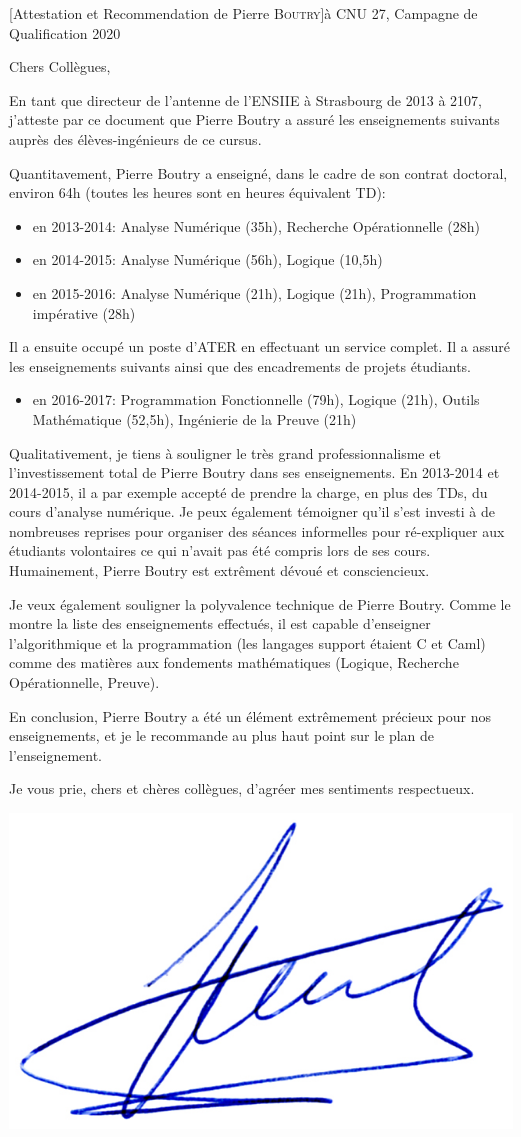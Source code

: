 \documentclass[a4paper,10pt]{article}
\begin{document}

\begin{letter}[Attestation et Recommendation de Pierre \textsc{Boutry}]{à}%
{CNU 27, Campagne de Qualification 2020}

Chers Collègues,

En tant que directeur de l'antenne de l'ENSIIE à Strasbourg de 2013 à 2107,
j'atteste par ce document que Pierre Boutry a assuré les enseignements suivants
auprès des élèves-ingénieurs de ce cursus.

\noindent 
Quantitavement, Pierre Boutry a enseigné, dans le cadre de son contrat doctoral, environ 64h (toutes les heures
sont en heures équivalent TD):
\begin{itemize}
	  \item  en 2013-2014: Analyse Numérique (35h), Recherche Opérationnelle (28h)
	  \item  en 2014-2015: Analyse Numérique (56h), Logique (10,5h)
	  \item  en 2015-2016:  Analyse Numérique (21h), Logique (21h), Programmation impérative (28h)
\end{itemize}

\smallskip

\noindent Il a ensuite occupé un poste d'ATER en effectuant un service complet. Il a assuré les
enseignements suivants ainsi que des encadrements de projets étudiants.
\begin{itemize}
	  \item  en 2016-2017:  Programmation Fonctionnelle (79h), Logique (21h), 
		    Outils Mathématique (52,5h), Ingénierie de la Preuve (21h)
\end{itemize}

\bigskip

\noindent Qualitativement, je tiens à souligner le très grand professionnalisme et l'investissement total
de Pierre Boutry dans ses enseignements. 
%
En 2013-2014 et 2014-2015, il a par exemple accepté de prendre la charge, en plus des TDs, du cours 
d'analyse numérique. Je peux également témoigner qu'il s'est investi à de nombreuses
reprises pour organiser des séances informelles pour ré-expliquer aux étudiants volontaires
ce qui n'avait pas été compris lors de ses cours. Humainement, Pierre Boutry est 
extrêment dévoué et consciencieux.

Je veux également souligner la polyvalence technique de Pierre Boutry.
Comme le montre la liste des enseignements effectués, il est capable d'enseigner l'algorithmique
et la programmation (les langages support étaient C et Caml) comme des matières aux
fondements mathématiques (Logique, Recherche Opérationnelle, Preuve). 

En conclusion, Pierre Boutry a été un élément extrêmement précieux pour nos enseignements,
et je le recommande au plus haut point sur le plan de l'enseignement.

Je vous prie, chers et chères collègues, d'agréer mes sentiments respectueux.
\end{letter}
\begin{flushright}
\includegraphics[width=.2\textwidth]{signgenaud.jpg}
\end{flushright}
\end{document}
